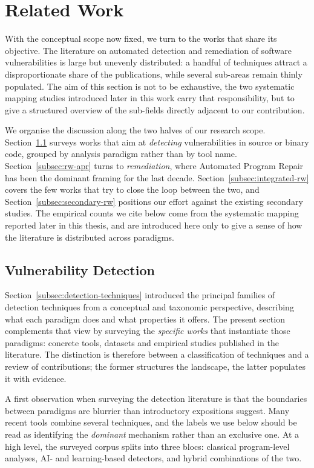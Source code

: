 \section{Related Work}
\label{sec:related-work}

With the conceptual scope now fixed, we turn to the works that share its
objective. The literature on automated detection and remediation of
software vulnerabilities is large but unevenly distributed: a handful of
techniques attract a disproportionate share of the publications, while
several sub-areas remain thinly populated. The aim of this section is
not to be exhaustive, the two systematic mapping studies introduced
later in this work carry that responsibility, but to give a structured
overview of the sub-fields directly adjacent to our contribution.

We organise the discussion along the two halves of our research scope.
Section~\ref{subsec:rw-detection} surveys works that aim at
\emph{detecting} vulnerabilities in source or binary code, grouped by
analysis paradigm rather than by tool name. Section~\ref{subsec:rw-apr}
turns to \emph{remediation}, where Automated Program Repair has been
the dominant framing for the last decade.
Section~\ref{subsec:integrated-rw} covers the few works that try to
close the loop between the two, and
Section~\ref{subsec:secondary-rw} positions our effort against the
existing secondary studies. The empirical counts we cite below come
from the systematic mapping reported later in this thesis, and are
introduced here only to give a sense of how the literature is
distributed across paradigms.

\subsection{Vulnerability Detection}
\label{subsec:rw-detection}

Section~\ref{subsec:detection-techniques} introduced the principal
families of detection techniques from a conceptual and taxonomic
perspective, describing what each paradigm does and what properties it
offers. The present section complements that view by surveying the
\emph{specific works} that instantiate those paradigms: concrete tools,
datasets and empirical studies published in the literature. The
distinction is therefore between a classification of techniques and a
review of contributions; the former structures the landscape, the
latter populates it with evidence.

A first observation when surveying the detection literature is that
the boundaries between paradigms are blurrier than introductory
expositions suggest. Many recent tools combine several techniques, and
the labels we use below should be read as identifying the
\emph{dominant} mechanism rather than an exclusive one. At a high
level, the surveyed corpus splits into three blocs: classical
program-level analyses, AI- and learning-based detectors, and hybrid
combinations of the two.

